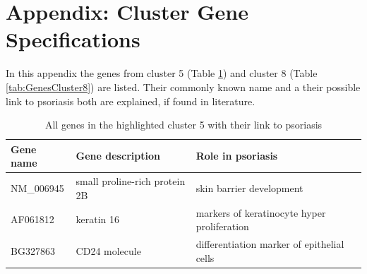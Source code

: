 \documentclass[10pt,a4paper]{report}
\begin{document}
	\section{Appendix: Cluster Gene Specifications}
	\label{app:ClusterGeneSpecifications}
	
	In this appendix the genes from cluster 5 (Table \ref{tab:GenesCluster5}) and cluster 8 (Table \ref{tab:GenesCluster8}) are listed. Their commonly known name and a their possible link to psoriasis both are explained, if found in literature.
	
	\begin{table}[]
		\centering
		\caption{All genes in the highlighted cluster 5 with their link to psoriasis}
		\label{tab:GenesCluster5}
		\begin{tabular}{l|p{4.5cm} p{8.5cm}}
			\textbf{Gene name} & \textbf{Gene description}                                                                                               & \textbf{Role in psoriasis}                                                                                                                                                                                                                \\ \hline
			NM\_006945         & small proline-rich protein 2B                                                                                           & skin barrier development \cite{roberson2010psoriasis}                                                                                                                                                                                                                  \\
			AF061812           & keratin 16                                                                                                              & markers of keratinocyte hyper proliferation \cite{leigh1995keratins}                                                                                                                                                                                                \\
			BG327863           & CD24 molecule                                                                                                           & differentiation marker of epithelial cells \cite{vegfors2012expression}                                                                                                                                                                                                \\

\end{tabular}
\end{table}
\end{document}
